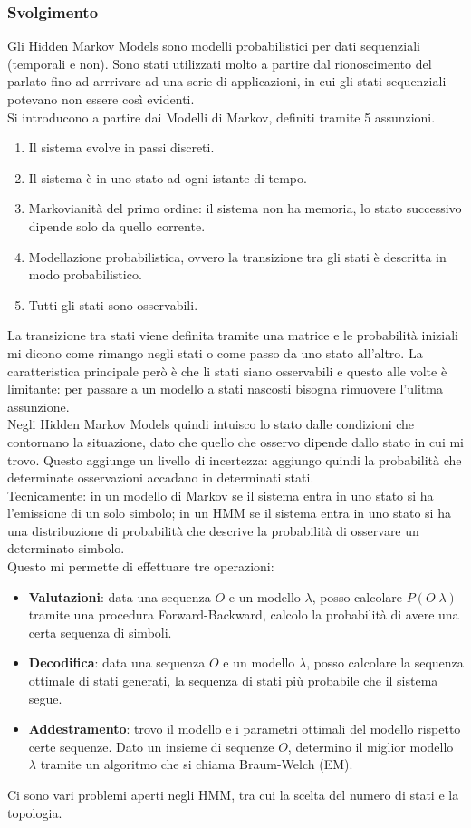 \documentclass{article}
\begin{document}
\subsubsection*{Svolgimento}
Gli Hidden Markov Models sono modelli probabilistici per dati sequenziali (temporali e non). Sono stati utilizzati molto a partire dal rionoscimento del parlato fino ad arrrivare ad una serie di applicazioni, in cui gli stati sequenziali potevano non essere così evidenti.\\
Si introducono a partire dai Modelli di Markov, definiti tramite 5 assunzioni.
\begin{enumerate}
    \item Il sistema evolve in passi discreti.
    \item Il sistema è in uno stato ad ogni istante di tempo.
    \item Markovianità del primo ordine: il sistema non ha memoria, lo stato successivo dipende solo da quello corrente.
    \item Modellazione probabilistica, ovvero la transizione tra gli stati è descritta in modo probabilistico.
    \item Tutti gli stati sono osservabili.
\end{enumerate}
La transizione tra stati viene definita tramite una matrice e le probabilità iniziali mi dicono come rimango negli stati o come passo da uno stato all'altro. La caratteristica principale però è che li stati siano osservabili e questo alle volte è limitante: per passare a un modello a stati nascosti bisogna rimuovere l'ulitma assunzione. \\
Negli Hidden Markov Models quindi intuisco lo stato dalle condizioni che contornano la situazione, dato che quello che osservo dipende dallo stato in cui mi trovo. Questo aggiunge un livello di incertezza: aggiungo quindi la probabilità che determinate osservazioni accadano in determinati stati.\\
Tecnicamente: in un modello di Markov se il sistema entra in uno stato si ha l'emissione di un solo simbolo; in un HMM se il sistema entra in uno stato si ha una distribuzione di probabilità che descrive la probabilità di osservare un determinato simbolo.\\
Questo mi permette di effettuare tre operazioni:
\begin{itemize}
    \item \textbf{Valutazioni}: data una sequenza $O$ e un modello $\lambda$, posso calcolare $P(O|\lambda)$ tramite una procedura Forward-Backward, calcolo la probabilità di avere una certa sequenza di simboli.
    \item \textbf{Decodifica}: data una sequenza $O$ e un modello $\lambda$, posso calcolare la sequenza ottimale di stati generati, la sequenza di stati più probabile che il sistema segue.
    \item \textbf{Addestramento}: trovo il modello e i parametri ottimali del modello rispetto certe sequenze. Dato un insieme di sequenze $O$, determino il miglior modello $\lambda$ tramite un algoritmo che si chiama Braum-Welch (EM).
\end{itemize}
Ci sono vari problemi aperti negli HMM, tra cui la scelta del numero di stati e la topologia. 
\end{document}
